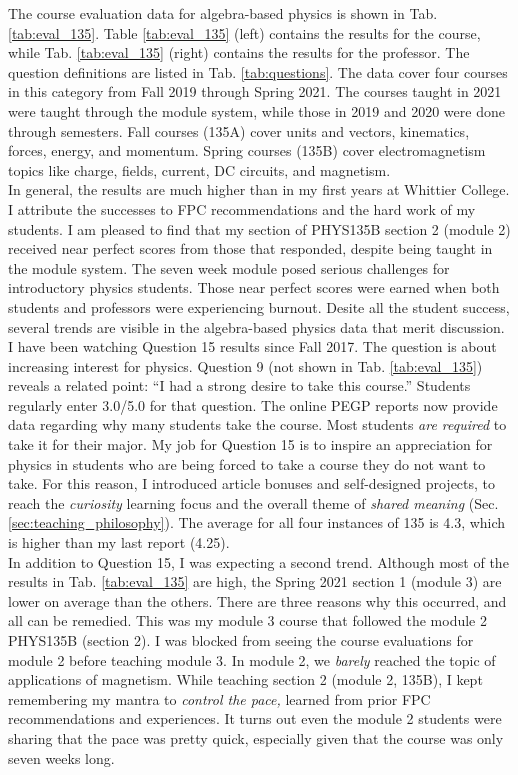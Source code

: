 \documentclass[../../main.tex]{subfiles}
\begin{document}
The course evaluation data for algebra-based physics is shown in Tab. \ref{tab:eval_135}.  Table \ref{tab:eval_135} (left) contains the results for the course, while Tab. \ref{tab:eval_135} (right) contains the results for the professor.  The question definitions are listed in Tab. \ref{tab:questions}.  The data cover four courses in this category from Fall 2019 through Spring 2021.  The courses taught in 2021 were taught through the module system, while those in 2019 and 2020 were done through semesters.  Fall courses (135A) cover units and vectors, kinematics, forces, energy, and momentum.  Spring courses (135B) cover electromagnetism topics like charge, fields, current, DC circuits, and magnetism.
\\
\vspace{0.15cm}
In general, the results are much higher than in my first years at Whittier College.  I attribute the successes to FPC recommendations and the hard work of my students.  I am pleased to find that my section of PHYS135B section 2 (module 2) received near perfect scores from those that responded, despite being taught in the module system.  The seven week module posed serious challenges for introductory physics students.  Those near perfect scores were earned when both students and professors were experiencing burnout.  Desite all the student success, several trends are visible in the algebra-based physics data that merit discussion.
\\
\vspace{0.15cm}
I have been watching Question 15 results since Fall 2017.  The question is about increasing interest for physics.  Question 9 (not shown in Tab. \ref{tab:eval_135}) reveals a related point: ``I had a strong desire to take this course.''  Students regularly enter 3.0/5.0 for that question.  The online PEGP reports now provide data regarding why many students take the course.  Most students \textit{are required} to take it for their major.  My job for Question 15 is to inspire an appreciation for physics in students who are being forced to take a course they do not want to take.  For this reason, I introduced article bonuses and self-designed projects, to reach the \textit{curiosity} learning focus and the overall theme of \textit{shared meaning} (Sec. \ref{sec:teaching_philosophy}).  The average for all four instances of 135 is 4.3, which is higher than my last report (4.25).
\\
\vspace{0.15cm}
In addition to Question 15, I was expecting a second trend.  Although most of the results in Tab. \ref{tab:eval_135} are high, the Spring 2021 section 1 (module 3) are lower on average than the others.  There are three reasons why this occurred, and all can be remedied.  This was my module 3 course that followed the module 2 PHYS135B (section 2).  I was blocked from seeing the course evaluations for module 2 before teaching module 3.  In module 2, we \textit{barely} reached the topic of applications of magnetism.  While teaching section 2 (module 2, 135B), I kept remembering my mantra to \textit{control the pace,} learned from prior FPC recommendations and experiences.  It turns out even the module 2 students were sharing that the pace was pretty quick, especially given that the course was only seven weeks long.
\end{document}
